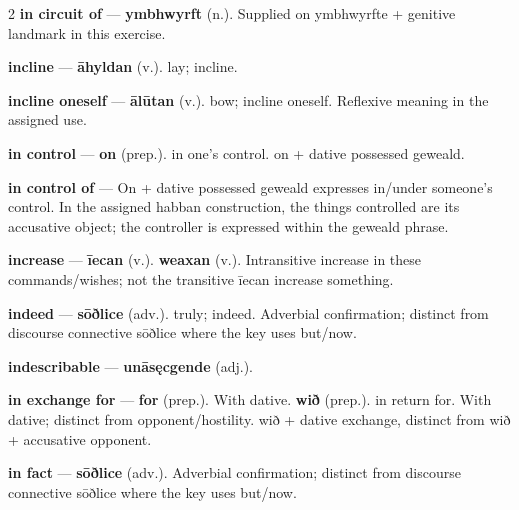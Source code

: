 \begin{multicols}{2}
\textbf{in circuit of} — \textbf{ymbhwyrft} (n.). Supplied on ymbhwyrfte + genitive landmark in this exercise.\par
\textbf{incline} — \textbf{āhyldan} (v.). lay; incline.\par
\textbf{incline oneself} — \textbf{ālūtan} (v.). bow; incline oneself. Reflexive meaning in the assigned use.\par
\textbf{in control} — \textbf{on} (prep.). in one's control. on + dative possessed geweald.\par
\textbf{in control of} — On + dative possessed geweald expresses in/under someone’s control. In the assigned habban construction, the things controlled are its accusative object; the controller is expressed within the geweald phrase.\par
\textbf{increase} — \textbf{īecan} (v.).  \textbf{weaxan} (v.). Intransitive increase in these commands/wishes; not the transitive īecan increase something.\par
\textbf{indeed} — \textbf{sōðlice} (adv.). truly; indeed. Adverbial confirmation; distinct from discourse connective sōðlice where the key uses but/now.\par
\textbf{indescribable} — \textbf{unāsęcgende} (adj.).\par
\textbf{in exchange for} — \textbf{for} (prep.). With dative. \textbf{wið} (prep.). in return for. With dative; distinct from opponent/hostility. wið + dative exchange, distinct from wið + accusative opponent.\par
\textbf{in fact} — \textbf{sōðlice} (adv.). Adverbial confirmation; distinct from discourse connective sōðlice where the key uses but/now.\par

\end{multicols}
